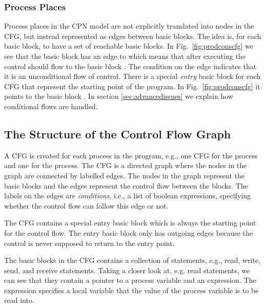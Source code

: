 \subsubsection{Process Places}
Process places in the CPN model are not explicitly translated into nodes in the CFG, but instead represented as edges between basic blocks. The idea is, for each basic block, to have a set of reachable basic blocks. In Fig.~\ref{fig:prodconscfg} we see that the basic block  has an edge to  which means that after executing  the control should flow to the basic block . The condition  on the edge indicates that it is an unconditional flow of control. There is a special \emph{entry} basic block for each CFG that represent the starting point of the program. In Fig.~\ref{fig:prodconscfg} it points to the basic block . In section \ref{sec:advancedissues} we explain how conditional flows are handled.

\subsection{The Structure of the Control Flow Graph}
\label{sec:cfgebnf}
A CFG is created for each process in the program, e.g., one CFG for the  process and one for the  process. The CFG is a directed graph where the nodes in the graph are connected by labelled edges. The nodes in the graph represent the basic blocks and the edges represent the control flow between the blocks. The labels on the edges are \emph{conditions}, i.e., a list of boolean expressions, specifying whether the control flow can follow this edge or not.

The CFG contains a special entry basic block which is always the starting point for the control flow. The entry basic block only has outgoing edges because the control is never supposed to return to the entry point. 

The basic blocks in the CFG contains a collection of statements, e.g., read, write, send, and receive statements. Taking a closer look at, e.g. read statements, we can see that they contain a pointer to a process variable and an expression. The expression specifies a local variable that the value of the process variable is to be read into.
